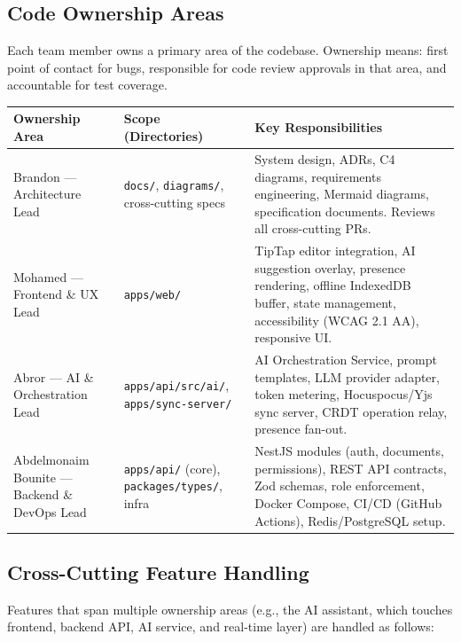 \documentclass[10pt, a4paper]{article}
\begin{document}
\subsection{Code Ownership Areas}

Each team member owns a primary area of the codebase. Ownership means: first point of contact for bugs, responsible for code review approvals in that area, and accountable for test coverage.

{\small
\begin{tabularx}{\textwidth}{@{}lXX@{}}
\toprule
\textsf{\textbf{Ownership Area}} & \textsf{\textbf{Scope (Directories)}} & \textsf{\textbf{Key Responsibilities}} \\
\midrule
Brandon --- Architecture Lead & \texttt{docs/}, \texttt{diagrams/}, cross-cutting specs & System design, ADRs, C4 diagrams, requirements engineering, Mermaid diagrams, specification documents. Reviews all cross-cutting PRs. \\
\addlinespace[3pt]
Mohamed --- Frontend \& UX Lead & \texttt{apps/web/} & TipTap editor integration, AI suggestion overlay, presence rendering, offline IndexedDB buffer, state management, accessibility (WCAG 2.1 AA), responsive UI. \\
\addlinespace[3pt]
Abror --- AI \& Orchestration Lead & \texttt{apps/api/src/ai/}, \texttt{apps/sync-server/} & AI Orchestration Service, prompt templates, LLM provider adapter, token metering, Hocuspocus/Yjs sync server, CRDT operation relay, presence fan-out. \\
\addlinespace[3pt]
Abdelmonaim Bounite --- Backend \& DevOps Lead & \texttt{apps/api/} (core), \texttt{packages/types/}, infra & NestJS modules (auth, documents, permissions), REST API contracts, Zod schemas, role enforcement, Docker Compose, CI/CD (GitHub Actions), Redis/PostgreSQL setup. \\
\bottomrule
\end{tabularx}
}

\subsection{Cross-Cutting Feature Handling}

Features that span multiple ownership areas (e.g., the AI assistant, which touches frontend, backend API, AI service, and real-time layer) are handled as follows:
\end{document}
